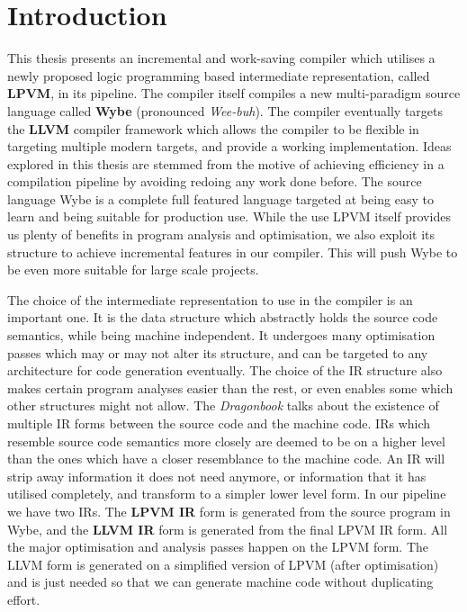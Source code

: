 \chapter{Introduction}

This thesis presents an incremental and work-saving compiler which utilises a
newly proposed logic programming based intermediate representation, called
\textbf{LPVM}, in its pipeline. The compiler itself compiles a new
multi-paradigm source language called \textbf{Wybe} (pronounced
\textit{Wee-buh}). The compiler eventually targets the \textbf{LLVM} compiler
framework which allows the compiler to be flexible in targeting multiple modern
targets, and provide a working implementation. Ideas explored in this thesis
are stemmed from the motive of achieving efficiency in a compilation pipeline
by avoiding redoing any work done before. The source language Wybe is a
complete full featured language targeted at being easy to learn and being
suitable for production use. While the use LPVM itself provides us plenty of
benefits in program analysis and optimisation, we also exploit its structure to
achieve incremental features in our compiler. This will push Wybe to be even
more suitable for large scale projects.

The choice of the intermediate representation to use in the compiler is an
important one. It is the data structure which abstractly holds the source code
semantics, while being machine independent. It undergoes many optimisation
passes which may or may not alter its structure, and can be targeted to any
architecture for code generation eventually. The choice of the IR structure
also makes certain program analyses easier than the rest, or even enables some
which other structures might not allow. The \textit{Dragonbook} talks about the
existence of multiple IR forms between the source code and the machine
code. IRs which resemble source code semantics more closely are deemed to be on
a higher level than the ones which have a closer resemblance to the machine
code. An IR will strip away information it does not need anymore, or
information that it has utilised completely, and transform to a simpler lower
level form. In our pipeline we have two IRs. The \textbf{LPVM IR} form is
generated from the source program in Wybe, and the \textbf{LLVM IR} form is
generated from the final LPVM IR form. All the major optimisation and
analysis passes happen on the LPVM form. The LLVM form is generated on a
simplified version of LPVM (after optimisation) and is just needed so that we
can generate machine code without duplicating effort. 

